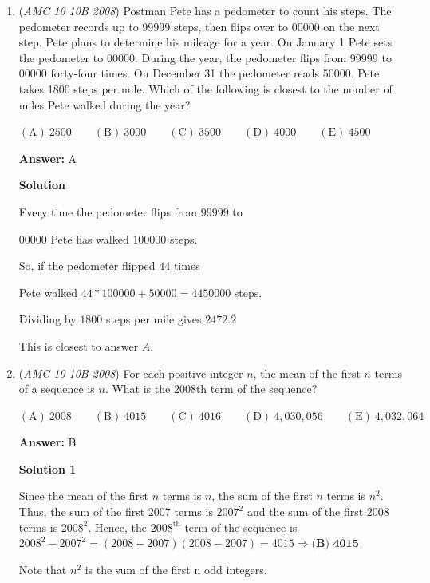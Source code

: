 \begin{enumerate}
	\item (\textit{AMC 10 10B 2008}) Postman Pete has a pedometer to count his steps. The pedometer records up to 99999 steps, then flips over to 00000 on the next step. Pete plans to determine his mileage for a year. On January 1 Pete sets the pedometer to 00000. During the year, the pedometer flips from 99999 to 00000 forty-four 
times. On December 31 the pedometer reads 50000. Pete takes 1800 steps per mile. Which of the following is closest to the number of miles Pete walked during the year?


 $\mathrm{(A)}\ 2500\qquad\mathrm{(B)}\ 3000\qquad\mathrm{(C)}\ 3500\qquad\mathrm{(D)}\ 4000\qquad\mathrm{(E)}\ 4500$

 \textbf{Answer: }A



\textbf{Solution}

Every time the pedometer flips from $99999$ to

 $00000$ Pete has walked $100000$ steps.

 So, if the pedometer flipped $44$ times

 Pete walked $44*100000+50000=4450000$ steps.

 Dividing by $1800$ steps per mile gives $2472.\overline{2}$

 This is closest to answer $\boxed{A}$.

 


	\item (\textit{AMC 10 10B 2008}) For each positive integer $n$, the mean of the first $n$ terms of a sequence is $n$. What is the 2008th term of the sequence?


 $\mathrm{(A)}\ {{{2008}}} \qquad \mathrm{(B)}\ {{{4015}}} \qquad \mathrm{(C)}\ {{{4016}}} \qquad \mathrm{(D)}\ {{{4,030,056}}} \qquad \mathrm{(E)}\ {{{4,032,064}}}$

 \textbf{Answer: }B



\textbf{Solution 1}

Since the mean of the first $n$ terms is $n$, the sum of the first $n$ terms is $n^2$. Thus, the sum of the first $2007$ terms is $2007^2$ and the sum of the first $2008$ terms is $2008^2$. Hence, the $2008^{\text{th}}$ term of the sequence is $2008^2-2007^2=(2008+2007)(2008-2007)=4015\Rightarrow \boxed{\textbf{(B) 4015}}$

 Note that $n^2$ is the sum of the first n odd integers.

 



\end{enumerate}
